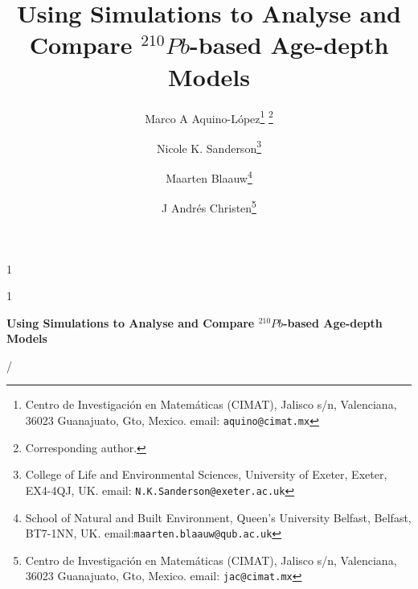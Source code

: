 \documentclass [10pt] {article}
\date{ }
\newcommand{\blind}{1}
\newcommand{\papertitle}{Using Simulations to Analyse and Compare $^{210}Pb$-based Age-depth Models}
\begin{document}
	\def\spacingset#1{\renewcommand{\baselinestretch}%
		{#1}\small\normalsize} \spacingset{1}
	\blind
	{
		\title{\textbf{\papertitle}}

		\author{Marco A Aquino-L\'opez\thanks{
				Centro de Investigaci\'on en Matem\'aticas (CIMAT),
				Jalisco s/n, Valenciana, 36023 Guanajuato, Gto, Mexico.
				email: \texttt{aquino@cimat.mx} } \thanks{Corresponding author.}
					\and
			Nicole K. Sanderson\thanks{
				College of Life and Environmental Sciences, University of Exeter,
				Exeter, EX4-4QJ, UK.
				email: \texttt{N.K.Sanderson@exeter.ac.uk}}
					\and
			Maarten Blaauw\thanks{School of Natural and Built Environment,
				Queen's University Belfast,
				Belfast, BT7-1NN, UK.
				email:\texttt{maarten.blaauw@qub.ac.uk}  }
					\and
			J Andr\'es Christen\thanks{
				Centro de Investigaci\'on en Matem\'aticas (CIMAT),
				Jalisco s/n, Valenciana, 36023 Guanajuato, Gto, Mexico.
				email: \texttt{jac@cimat.mx}  }
			}
		\maketitle
	} \fi

	\blind
	{
		\bigskip
		\bigskip
		\bigskip
		\begin{center}
			{\LARGE\bf \papertitle}
		\end{center}
		\medskip/
	} \fi
\end{document}
